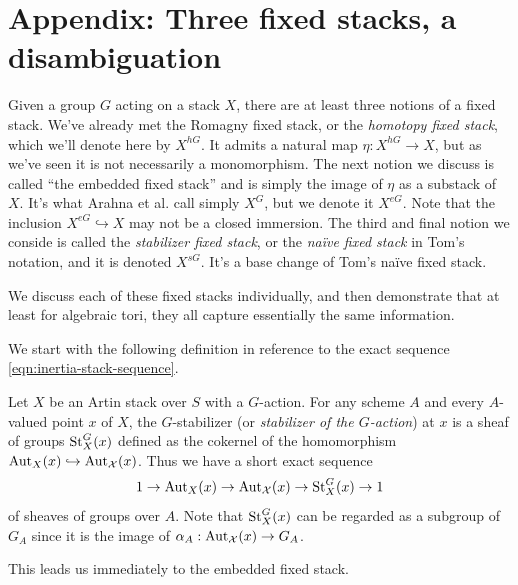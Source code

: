 \documentclass[12pt,dvipsnames]{amsart}
\begin{document}
\newpage

\section{Appendix: Three fixed stacks, a disambiguation}\label{rl-001A}

Given a group \(G\) acting on a stack \(X\), there are at least three notions of a fixed stack. We've already met the Romagny fixed stack, or the \emph{homotopy fixed stack}, which we'll denote here by \(X^{hG}\). It admits a natural map \(\eta:X^{hG}\to X\), but as we've seen it is not necessarily a monomorphism. The next notion we discuss is called ``the embedded fixed stack'' and is simply the image of $\eta$ as a substack of $X$. It's what Arahna et al. call simply $X^G$, but we denote it \(X^{eG}\). Note that the inclusion \(X^{eG}\hookrightarrow X\) may not be a closed immersion. The third and final notion we conside is called the \textit{stabilizer fixed stack}, or the \textit{na\"ive fixed stack} in Tom's notation, and it is denoted \(X^{sG}\). It's a base change of Tom's na\"ive fixed stack.

We discuss each of these fixed stacks individually, and then demonstrate that at least for algebraic tori, they all capture essentially the same information.

We start with the following definition in reference to the exact sequence \eqref{eqn:inertia-stack-sequence}.
\begin{definition}\label{rl-001B}
  Let \(X\) be an Artin stack over \(S\) with a \(G\)-action. For any scheme \(A\) and every \(A\)-valued point \(x\) of \(X\), the \(G\)-stabilizer (or \emph{stabilizer of the \(G\)-action}) at \(x\) is a sheaf of groups \(\operatorname{St}^G_X(x)\) defined as the cokernel of the homomorphism \(\operatorname{Aut}_X(x) \hookrightarrow \operatorname{Aut}_{\mathcal X}(x)\). Thus we have a short exact sequence
  \begin{align*}
    1 \to \operatorname{Aut}_X(x) \to \operatorname{Aut}_{\mathcal X}(x) \to \operatorname{St}^G_X(x) \to 1
  \end{align*}
  of sheaves of groups over \(A\). Note that \(\operatorname{St}^G_X(x)\) can be regarded as a subgroup of \(G_A\) since it is the image of \(\alpha_A:\operatorname{Aut}_{\mathcal X}(x) \to G_A\).
\end{definition}

This leads us immediately to the embedded fixed stack.
\end{document}
